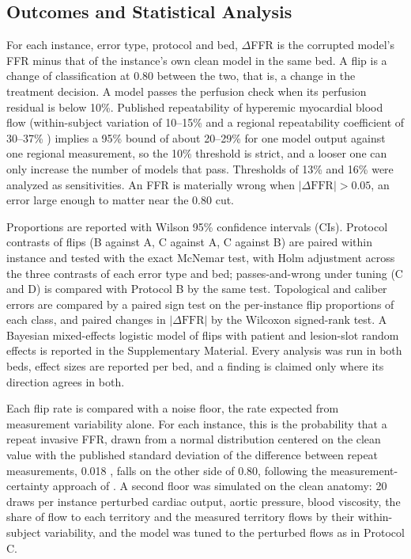 \documentclass[journal]{IEEEtran}
\begin{document}
\subsection{Outcomes and Statistical Analysis}
For each instance, error type, protocol and bed, $\Delta$FFR is the corrupted model's FFR minus that of the
instance's own clean model in the same bed. A flip is a change of classification at 0.80 between the two, that is,
a change in the treatment decision. A model passes the perfusion check when its perfusion residual is below 10\%.
Published repeatability of hyperemic myocardial blood flow (within-subject variation of 10--15\%
\cite{schindler2023} and a regional repeatability coefficient of 30--37\% \cite{brown2018}) implies a 95\% bound of
about 20--29\% for one model output against one regional measurement, so the 10\% threshold is strict, and a looser
one can only increase the number of models that pass. Thresholds of 13\% and 16\% were analyzed as
sensitivities. An FFR is materially wrong when $|\Delta\mathrm{FFR}| > 0.05$, an error large enough to matter near
the 0.80 cut.

Proportions are reported with Wilson 95\% confidence intervals (CIs). Protocol contrasts of flips (B against A, C
against A, C against B) are paired within instance and tested with the exact McNemar test, with Holm adjustment
across the three contrasts of each error type and bed; passes-and-wrong under tuning (C and D) is compared with
Protocol B by the same test. Topological and caliber errors are compared by a paired sign test on
the per-instance flip proportions of each class, and paired changes in $|\Delta\mathrm{FFR}|$ by the Wilcoxon
signed-rank test. A Bayesian mixed-effects logistic model of flips with patient and lesion-slot random effects is reported in the
Supplementary Material. Every analysis was run in both beds, effect sizes are reported per bed, and a finding is
claimed only where its direction agrees in both.

Each flip rate is compared with a noise floor, the rate expected from measurement variability alone. For each instance, this is the probability that a repeat invasive FFR, drawn from a normal
distribution centered on the clean value with the published standard deviation of the difference between repeat measurements, 0.018 \cite{johnson2015}, falls on the other side of 0.80, following the measurement-certainty approach of \cite{petraco2013}. A second floor was simulated on the clean anatomy: 20 draws
per instance perturbed cardiac output, aortic pressure, blood viscosity, the share of flow to each territory and the
measured territory flows by their within-subject variability, and the model was tuned to the perturbed flows as in
Protocol C.
\end{document}
